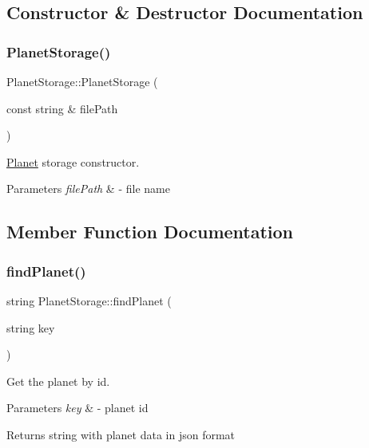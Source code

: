 \subsection{Constructor \& Destructor Documentation}
\mbox{\label{class_planet_storage_ad42e4909863d4871afd6f885b13229fa}} 
\subsubsection{\texorpdfstring{Planet\+Storage()}{PlanetStorage()}}
{\footnotesize\ttfamily Planet\+Storage\+::\+Planet\+Storage (\begin{DoxyParamCaption}\item[{const string \&}]{file\+Path }\end{DoxyParamCaption})}



\hyperlink{class_planet}{Planet} storage constructor. 


\begin{DoxyParams}{Parameters}
{\em file\+Path} & -\/ file name \\
\hline
\end{DoxyParams}


\subsection{Member Function Documentation}
\mbox{\label{class_planet_storage_a0fbb2ebb8a2426b21a4f46fcffeefc10}} 
\subsubsection{\texorpdfstring{find\+Planet()}{findPlanet()}}
{\footnotesize\ttfamily string Planet\+Storage\+::find\+Planet (\begin{DoxyParamCaption}\item[{string}]{key }\end{DoxyParamCaption})}



Get the planet by id. 


\begin{DoxyParams}{Parameters}
{\em key} & -\/ planet id \\
\hline
\end{DoxyParams}
\begin{DoxyReturn}{Returns}
string with planet data in json format 
\end{DoxyReturn}
\mbox{\label{class_planet_storage_af07459737c01ceca06a5f909d618fac1}} 
